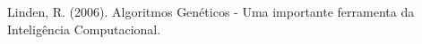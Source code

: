 \documentclass[twoside]{article}
\begin{document}
\begin{multicols}{2}

\begin{thebibliography}{99} %

Linden, R. (2006).
\newblock Algoritmos Genéticos - Uma importante ferramenta da Inteligência Computacional.
 
\end{thebibliography}


\end{multicols}
\end{document}
